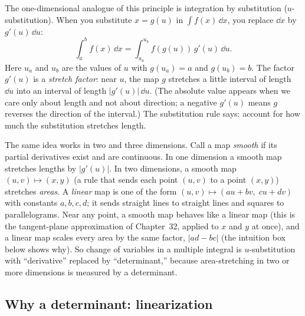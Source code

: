 The one-dimensional analogue of this principle is integration by substitution ($u$-substitution).
When you substitute $x=g(u)$ in $\int f(x)\,\dd x$, you replace
$\dd x$ by $g'(u)\,\dd u$:
\[
  \int_a^b f(x)\,\dd x=\int_{u_a}^{u_b} f(g(u))\,g'(u)\,\dd u .
\]
Here $u_a$ and $u_b$ are the values of $u$ with $g(u_a)=a$ and $g(u_b)=b$. The
factor $g'(u)$ is a \emph{stretch factor}: near $u$, the map $g$ stretches a
little interval of length $\dd u$ into an interval of length $|g'(u)|\,\dd u$.
(The absolute value appears when we care only about length and not about
direction; a negative $g'(u)$ means $g$ reverses the direction of the interval.)
The substitution rule says: account for how much the substitution stretches
length.

\begin{whybox}
The same idea works in two and three dimensions. Call a map \emph{smooth} if
its partial derivatives exist and are continuous. In one dimension a smooth map
stretches lengths by $|g'(u)|$. In two dimensions, a smooth map
$(u,v)\mapsto(x,y)$ (a rule that sends each point $(u,v)$ to a point $(x,y)$)
stretches \emph{areas}. A \emph{linear} map is one of the form
$(u,v)\mapsto(au+bv,\;cu+dv)$ with constants $a,b,c,d$; it sends straight lines
to straight lines and squares to parallelograms. Near any point, a smooth map
behaves like a linear map (this is the tangent-plane approximation of
Chapter~32, applied to $x$ and $y$ at once), and a linear map scales every area by
the same factor, $|ad-bc|$ (the intuition box below shows why). So change of
variables in a multiple integral is $u$-substitution with ``derivative'' replaced
by ``determinant,'' because area-stretching in two or more dimensions is measured
by a determinant.
\end{whybox}

\subsection{Why a determinant: linearization}


